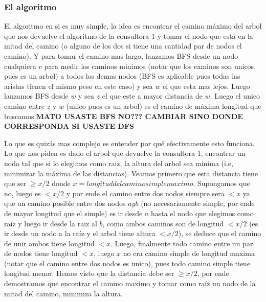 \documentclass[A4paper,oneside,fleqn,11pt]{article}
\theoremstyle{definition}
\begin{document}
\subsubsection{El algoritmo}
El algoritmo en si es muy simple, la idea es encontrar el camino máximo del arbol que nos devuelve el algoritmo de la consultora 1 y tomar el nodo que está en la mitad del camino (o alguno de los dos si tiene una cantidad par de nodos el camino). Y para tomar el camino mas largo, lanzamos BFS desde un nodo cualquiera $v$ para medir los caminos minimos (notar que los caminos son unicos, pues es un arbol) a todos los demas nodos (BFS es aplicable pues todas las aristas tienen el mismo peso en este caso) y sea $w$ el que esta mas lejos. Luego lanzamos BFS desde $w$ y sea $z$ el que este a mayor distancia de $w$. Luego el unico camino entre $z$ y $w$ (unico pues es un arbol) es el camino de máxima longitud que buscamos.\textbf{MATO USASTE BFS NO??? CAMBIAR SINO DONDE CORRESPONDA SI USASTE DFS}

Lo que es quizás mas complejo es entender por qué efectivamente esto funciona. Lo que nos piden es dado el arbol que devuelve la consultora 1, encontrar un nodo tal que si lo elegimos como raiz, la altura del arbol sea minima (i.e, minimizar la máxima de las distancias). Veamos primero que esta distancia tiene que ser $\geq x/2$ donde $x = longitud del camino simple maximo$. Supongamos que no, luego es $<x/2$ y por ende el camino entre dos nodos siempre sera $<x$ ya que un camino posible entre dos nodos $a y b$ (no necesariamente simple, por ende de mayor longitud que el simple) es ir desde $a$ hasta el nodo que elegimos como raíz y luego ir desde la raiz al $b$, como ambos caminos son de longitud $<x/2$ (es ir desde un nodo a la raíz y el arbol tiene altura $<x/2$), se deduce que el camino de unir ambos tiene longitud $<x$. Luego, finalmente todo camino entre un par de nodos tiene longitud $<x$, luego $x$ no era camino simple de longitud maxima (notar que el camino entre dos nodos es unico), pues todo camino simple tiene longitud menor. Hemos visto que la distancia debe ser $\geq x/2$, por ende demostramos que encontrar el camino maximo y tomar como raíz un nodo de la mitad del camino, minimiza la altura.
\end{document}
